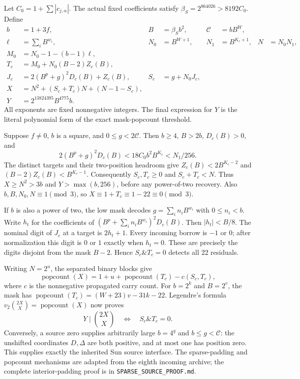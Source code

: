 Let $C_0=1+\sum|c_{j,\alpha}|$. The actual fixed coefficients satisfy
$\beta_S=2^{864026}>8192C_0$. Define
\begin{align*}
 b&=1+3f,& B&=\beta_Sb^2,& \mathcal C&=bB^W,\\
 \ell&=\sum_iB^{w_i},&N_0&=B^{W+1},&N_1&=B^{K_c+1},&N&=N_0N_1,\\
 M_0&=N_0-1-(b-1)\ell,\\
 T_c&=M_0+N_0(B-2)Z_c(B),\\
 J_c&=2(B^p+g)^2D_c(B)+Z_c(B),&S_c&=g+N_0J_c,\\
 X&=N^2+(S_c+T_c)N+(N-1-S_c),\\
 Y&=2^{13824395}B^{4775}b.
\end{align*}
All exponents are fixed nonnegative integers. The final expression for $Y$
is the literal polynomial form of the exact mask-popcount threshold.

Suppose $f\ne0$, $b$ is a square, and $0\le g<2\mathcal C$.
Then $b\ge4$, $B>2b$, $D_c(B)>0$, and
\[
 2(B^p+g)^2D_c(B)<18C_0b^2B^{K_c}<N_1/256.
\]
The distinct targets and their two-position headroom give
$Z_c(B)<2B^{K_c-2}$ and $(B-2)Z_c(B)<B^{K_c-1}$.
Consequently $S_c,T_c\ge0$ and $S_c+T_c<N$. Thus
$X\ge N^2>3b$ and $Y>\max(b,256)$, before any power-of-two recovery.
Also $b,B,N_0,N\equiv1\pmod3$, so
$X\equiv1+T_c\equiv1-22\equiv0\pmod3$.

If $b$ is also a power of two, the low mask decodes
$g=\sum_i n_iB^{w_i}$ with $0\le n_i<b$. Write $h_t$ for the coefficients
of $(B^p+\sum_i n_iB^{w_i})^2D_c(B)$. Then $|h_t|<B/8$.
The nominal digit of $J_c$ at a target is $2h_t+1$. Every incoming borrow
is $-1$ or $0$; after normalization this digit is $0$ or $1$ exactly when
$h_t=0$. These are precisely the digits disjoint from the mask $B-2$.
Hence $S_c\mathbin{\&}T_c=0$ detects all 22 residuals.

Writing $N=2^u$, the separated binary blocks give
\[
 \operatorname{popcount}(X)
 =1+u+\operatorname{popcount}(T_c)-c(S_c,T_c),
\]
where $c$ is the nonnegative propagated carry count. For $b=2^k$ and
$B=2^v$, the mask has
$\operatorname{popcount}(T_c)=(W+23)v-31k-22$.
Legendre's formula
$v_2\binom{2X}{X}=\operatorname{popcount}(X)$ now proves
\[
 Y\mid\binom{2X}{X}\quad\Longleftrightarrow\quad S_c\mathbin{\&}T_c=0.
\]
Conversely, a source zero supplies arbitrarily large $b=4^q$ and
$b\le g<\mathcal C$: the unshifted coordinates $D,\Delta$ are both positive,
and at most one has position zero. This supplies exactly the inherited
Sun source interface. The sparse-padding and popcount mechanisms are
adapted from the eighth incoming archive; the complete interior-padding
proof is in \texttt{SPARSE\_SOURCE\_PROOF.md}.

